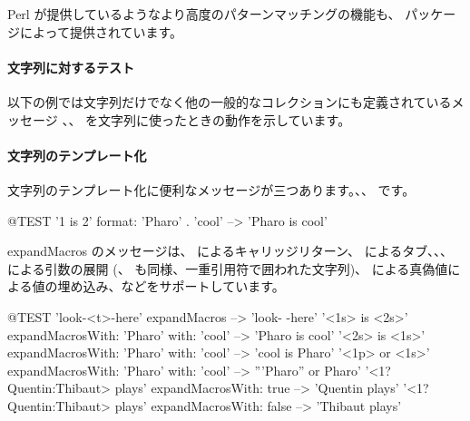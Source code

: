 \documentclass[a4paper,10pt,twoside]{book}
\begin{document}
Perl が提供しているようなより高度のパターンマッチングの機能も、 パッケージによって提供されています。

\paragraph{文字列に対するテスト} 以下の例では文字列だけでなく他の一般的なコレクションにも定義されているメッセージ 、、 を文字列に使ったときの動作を示しています。


\paragraph{文字列のテンプレート化}
文字列のテンプレート化に便利なメッセージが三つあります。、、 です。

\begin{code}{@TEST}
'{1} is {2}' format: {'Pharo' . 'cool'}  --> 'Pharo is cool'
\end{code}

expandMacros のメッセージは、 によるキャリッジリターン、 によるタブ、、、 による引数の展開 (、 も同様、一重引用符で囲われた文字列)、 による真偽値による値の埋め込み、などをサポートしています。


\begin{code}{@TEST}
'look-<t>-here' expandMacros                                         --> 'look-	-here'
'<1s> is <2s>' expandMacrosWith: 'Pharo' with: 'cool'   --> 'Pharo is cool'
'<2s> is <1s>' expandMacrosWith: 'Pharo' with: 'cool'   --> 'cool is Pharo'
'<1p> or <1s>' expandMacrosWith: 'Pharo' with: 'cool'  --> '''Pharo'' or Pharo'
'<1?Quentin:Thibaut> plays' expandMacrosWith: true     --> 'Quentin plays'
'<1?Quentin:Thibaut> plays' expandMacrosWith: false    --> 'Thibaut plays'
\end{code}
\end{document}

